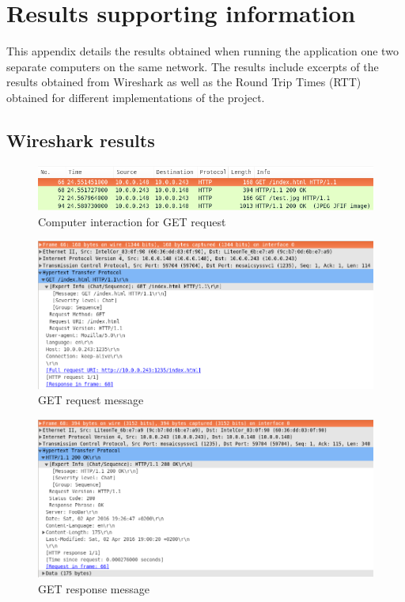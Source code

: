 \documentclass[10pt,twocolumn]{witseiepaper}
\begin{document}
\clearpage
\onecolumn
\appendix
\section{Results supporting information} %
\label{sec:results}
	
	This appendix details the results obtained when running the application one two separate computers on the same network. The results include excerpts of the results obtained from Wireshark as well as the Round Trip Times (RTT) obtained for different implementations of the project.

	\subsection{Wireshark results} %
	\label{sub:wireshark_results}
	
		\begin{figure}
			\centering
			\includegraphics[width=\columnwidth]{resources/get_html}
			\caption{Computer interaction for GET request}
			\label{fig:basic_get}
		\end{figure}
		
		\begin{figure}
			\centering
			\includegraphics[width=\columnwidth]{resources/message_get_html}
			\caption{GET request message}
			\label{fig:basic_get_message}
		\end{figure}
		
		\begin{figure}
			\centering
			\includegraphics[width=\columnwidth]{resources/message_get_response_html}
			\caption{GET response message}
			\label{fig:basic_get_response}
		\end{figure}
		




\end{document}
